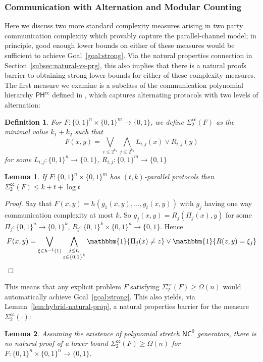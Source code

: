 \documentclass[11pt]{article}
\newtheorem{lemma}{Lemma}
\newtheorem{definition}{Definition}
\newcommand{\B}{\{0,1\}}
\begin{document}
\subsubsection{Communication with Alternation and Modular Counting}
Here we discuss two more standard complexity measures arising in two party communication complexity which provably capture the parallel-channel model; in principle, good enough lower bounds on either of these measures would be sufficient to achieve Goal~\ref{goal:strong}. Via the natural properties connection in Section~\ref{subsec:natural-vs-prg}, this also implies that there is a natural proofs barrier to obtaining strong lower bounds for either of these complexity measures. The first measure we examine is a subclass of the communication polynomial hierarchy $\mathsf{PH^{cc}}$ defined in \cite{babai1986complexity}, which captures alternating protocols with two levels of alternation:
\begin{definition}
For $F: \B^n \times \B^m \to \B$, we define $\mathsf{\Sigma_2^{cc}}(F)$ as the minimal value $k_1 + k_2$ such that
\[
F(x,y) = \bigvee_{i \leq 2^{k_1}} \bigwedge_{j \leq 2^{k_2}} L_{i,j}(x) \lor R_{i,j}(y)
\]
for some $L_{i,j}:\B^n\to \B$, $R_{i,j}: \B^m \to \B$
\end{definition}
\begin{lemma}\label{lem:sigma_2}
If $F:\B^n \times \B^m$ has $(t,k)$-parallel protocols then $\mathsf{\Sigma_2^{cc}}(F) \leq k + t + \log t$ 
\end{lemma}
\begin{proof}
Say that $F(x,y) = h(g_1(x,y),\ldots,g_t(x,y))$ with $g_j$ having one way communication complexity at most $k$. So $g_j(x,y) = R_j(\Pi_j(x),y)$ for some $\Pi_j: \B^n \to \B^k$, $R_j: \B^k \times \B^n \to \B$. Hence
\[
F(x,y)=\bigvee_{\xi \in h^{-1}(1)} \bigwedge_{\substack{j \leq t,\\ z \in \B^k}} \mathbbm{1}\{\Pi_j(x) \neq z\} \lor \mathbbm{1}\{R(z,y) = \xi_j\}
\]
\end{proof}

This means that any explicit problem $F$ satisfying $\mathsf{\Sigma_2^{cc}}(F)\geq \Omega(n)$ would automatically achieve Goal~\ref{goal:strong}. This also yields, via Lemma~\ref{lem:hybrid-natural-prop}, a natural properties barrier for the measure $\mathsf{\Sigma_2^{cc}}(\cdot)$:
\begin{lemma}
Assuming the existence of polynomial stretch $\mathsf{NC}^0$ generators, there is no natural proof of a lower bound $\mathsf{\Sigma_2^{cc}}(F) \geq \Omega(n)$ for $F: \B^n \times \B^{n} \to \B$.
\end{lemma}
\end{document}
